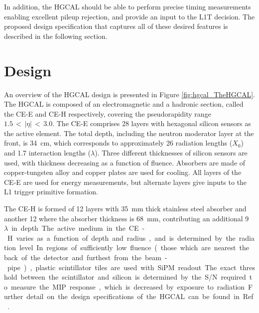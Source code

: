 In addition, the HGCAL should be able to perform precise timing measurements enabling excellent pileup rejection, and provide an input to the L1T decision.
The proposed design specification that captures all of these desired features is described in the following section.

\section{Design}

An overview of the HGCAL design is presented in Figure \ref{fig:hgcal_TheHGCAL}.
The HGCAL is composed of an electromagnetic and a hadronic section, called the CE-E and CE-H respectively, covering the pseudorapidity range $1.5\,<\,|\eta|\,<\,3.0$.
The CE-E comprises 28 layers with hexagonal silicon sensors as the active element.
The total depth, including the neutron moderator layer at the front, is \SI{34}{cm}, which corresponds to approximately 26 radiation lengths ($X_0$) and 1.7 interaction lengths ($\lambda$).
Three different thicknesses of silicon sensors are used, with thickness decreasing as a function of fluence.
Absorbers are made of copper-tungsten alloy and copper plates are used for cooling.
All layers of the CE-E are used for energy measurements, but alternate layers give inputs to the L1 trigger primitive formation.

The CE-H is formed of 12 layers with \SI{35}{mm} thick stainless steel absorber and another 12 where the absorber thickness is \SI{68}{mm}, contributing an additional \SI{9}{$\lambda$} in depth.
The active medium in the CE-H varies as a function of depth and radius, and is determined by the radiation level.
In regions of sufficiently low fluence (those which are nearest the back of the detector and furthest from the beam-pipe), plastic scintillator tiles are used with SiPM readout.
The exact threshold between the scintillator and silicon is determined by the S/N required to measure the MIP response, which is decreased by exposure to radiation.
Further detail on the design specifications of the HGCAL can be found in Ref.~\cite{HGCAL}.

